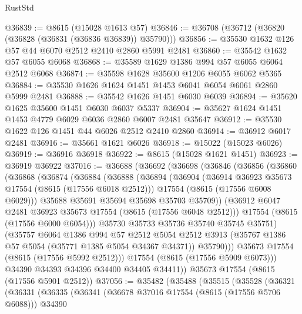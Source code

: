 \begin{lexlean}{RustStd}
\begin{coremodule}
@36839 := @8615 (@15028 @1613 @57)
@36846 := @36708 (@36712 (@36820 (@36828 (@36831 (@36836 @36839)) @35790)))
@36856 := @35530 @1632 @126 @57 @44 @6070 @2512 @2410 @2860 @5991 @2481
@36860 := @35542 @1632 @57 @6055 @6068
@36868 := @35589 @1629 @1386 @994 @57 @6055 @6064 @2512 @6068
@36874 := @35598 @1628 @35600 @1206 @6055 @6062 @5365
@36884 := @35530 @1626 @1624 @1451 @1453 @6041 @6054 @6061 @2860 @5999 @2481
@36888 := @35542 @1626 @1451 @6030 @6039
@36894 := @35620 @1625 @35600 @1451 @6030 @6037 @5337
@36904 := @35627 @1624 @1451 @1453 @4779 @6029 @6036 @2860 @6007 @2481 @35647
@36912 := @35530 @1622 @126 @1451 @44 @6026 @2512 @2410 @2860
@36914 := @36912 @6017 @2481
@36916 := @35661 @1621 @6026
@36918 := @15022 (@15023 @6026)
@36919 := @36916 @36918
@36922 := @8615 (@15028 @1621 @1451)
@36923 := @36919 @36922
@37016 := @36688
    (@36692
      (@36698
        (@36846
          (@36856
            (@36860
              (@36868
                (@36874
                  (@36884
                    (@36888
                      (@36894
                        (@36904
                          (@36914 @36923 @35673 @17554 (@8615 (@17556 @6018 @2512)))
                          @17554
                          (@8615 (@17556 @6008 @6029)))
                        @35688
                        @35691
                        @35694
                        @35698
                        @35703
                        @35709))
                    (@36912 @6047 @2481 @36923 @35673 @17554 (@8615 (@17556 @6048 @2512)))
                    @17554
                    (@8615 (@17556 @6000 @6054)))
                  @35730
                  @35733
                  @35736
                  @35740
                  @35745
                  @35751)
                (@35757
                  @6064
                  @1386
                  @994
                  @57
                  @2512
                  @5054
                  @2512
                  @3913
                  (@35767 @1386 @57 @5054 (@35771 @1385 @5054 @34367 @34371))
                  @35790)))
            @35673
            @17554
            (@8615 (@17556 @5992 @2512)))
          @17554
          (@8615 (@17556 @5909 @6073)))
        @34390
        @34393
        @34396
        @34400
        @34405
        @34411))
    @35673
    @17554
    (@8615 (@17556 @5901 @2512))
@37056 := @35482
    (@35488
      (@35515
        (@35528
          (@36321
            (@36331
              (@36335
                (@36341
                  (@36678 @37016 @17554 (@8615 (@17556 @5706 @6088)))
                  @34390

\end{coremodule}
\end{lexlean}
